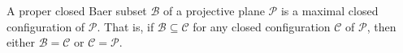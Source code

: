 A proper closed Baer subset $\mathcal{B}$ of a projective plane $\mathcal{P}$ is a maximal closed configuration of $\mathcal{P}$. That is, if $\mathcal{B} \subseteq \mathcal{C}$ for any closed configuration $\mathcal{C}$ of $\mathcal{P}$, then either $\mathcal{B} = \mathcal{C}$ or $\mathcal{C} = \mathcal{P}$.
